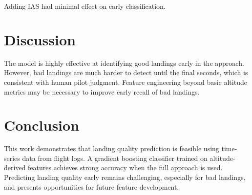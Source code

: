 \documentclass[conference]{IEEEtran}
\begin{document}
Adding IAS had minimal effect on early classification.

\section{Discussion}
The model is highly effective at identifying good landings early in the approach. However, bad landings are much harder to detect until the final seconds, which is consistent with human pilot judgment. Feature engineering beyond basic altitude metrics may be necessary to improve early recall of bad landings.

\section{Conclusion}
This work demonstrates that landing quality prediction is feasible using time-series data from flight logs. A gradient boosting classifier trained on altitude-derived features achieves strong accuracy when the full approach is used. Predicting landing quality early remains challenging, especially for bad landings, and presents opportunities for future feature development.



\end{document}
